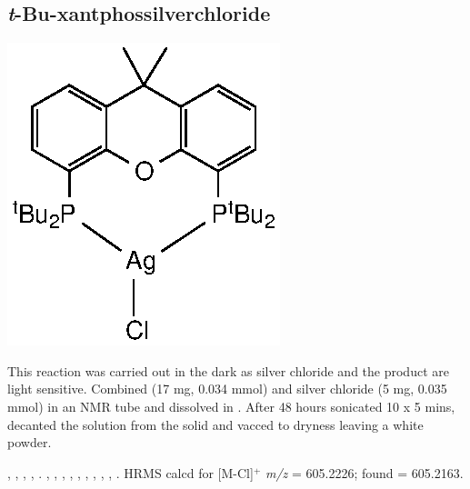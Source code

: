 


\subsection*{\emph{t}-Bu-xantphossilverchloride} 

\begin{structure}[h]
\begin{center}
\includegraphics{../Structures/CtBuSilverChloride.eps}
\end{center}
\end{structure}

This reaction was carried out in the dark as silver chloride and the product are light sensitive.  Combined  (17 mg, 0.034 mmol) and silver chloride (5 mg, 0.035 mmol) in an NMR tube and dissolved in .  After 48 hours sonicated 10 x 5 mins, decanted the solution from the solid and vacced to dryness leaving a white powder.  

,
,
,
,
.
,
,
,
,
,
,
,
,
,
.
HRMS calcd for  [M-Cl]$^+$ \emph{m/z} = 605.2226; found = 605.2163.



